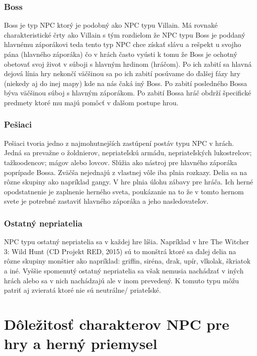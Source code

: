 \documentclass[10pt,twoside,slovak,a4paper]{article}
\begin{document}
\subsubsection{Boss} \label{BOSS}
Boss je typ NPC ktorý je podobný ako NPC typu Villain. Má rovnaké charakteristické črty ako Villain s tým rozdielom že NPC typu Boss je poddaný hlavnému záporákovi teda tento typ NPC chce získať slávu a rešpekt u svojho pána (hlavného záporáka) čo v hrách často vyústi k tomu že Boss je ochotný obetovať svoj život v súboji s hlavným hrdinom (hráčom). Po ich zabití sa hlavná dejová línia hry nekončí väčšinou sa po ich zabití posúvame do ďalšej fázy hry (niekedy aj do inej mapy) kde na nás čaká iný Boss. Po zabití posledného Bossa býva väčšinou súboj s hlavným záporákom. Po zabití Bossa hráč obdrží špecifické predmety ktoré mu majú pomôcť v ďalšom postupe hrou. 

\subsubsection{Pešiaci} \label{Pesiaci}
Pešiaci tvoria jedno z najmohutnejších zastúpení postáv typu NPC v hrách. Jedná sa prevažne o žoldnierov, nepriateľskú armádu, nepriateľských lukostrelcov; tažkoodencov;  mágov alebo lovcov. Slúžia ako nástroj pre hlavného záporáka poprípade Bossa. Zväčša nejednajú z vlastnej vôle iba plnia rozkazy. Delia sa na rôzne skupiny ako napríklad gangy. V hre plnia úlohu zábavy pre hráča. Ich herné opodstatnenie je zaplnenie herného sveta, poukázanie na to že v tomto hernom svete je potrebné zastaviť hlavného záporáka a jeho nasledovateľov.  

\subsubsection{Ostatný nepriatelia} \label{Ostatny_nepriatelia}
NPC typu ostatný nepriatelia sa v každej hre líšia. Napríklad v hre The Witcher 3: Wild Hunt (CD Projekt RED, 2015) sú to monštrá ktoré sa ďalej delia na rôzne skupiny monštier ako napríklad: griffin, siréna, drak, upír, vlkolak, škriatok a iné.  Vyššie spomenutý ostatný nepriatelia sa však nemusia nachádzať v iných hrách alebo sa v nich nachádzajú ale v inom prevedený. K tomuto typu môžu patriť aj zvieratá ktoré nie sú neutrálne/ priateľské.


\section{Dôležitosť charakterov NPC pre hry a herný priemysel}   \label{Dolezitost}
\end{document}
